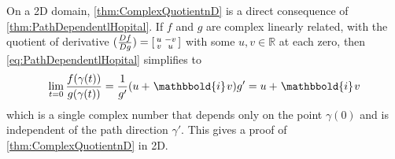 \documentclass{article}
\newcommand{\Albert}[1]{{\color[rgb]{0.2,0.4,0.8}\textbf{Albert: } #1}}
\theoremstyle{theorem}
\theoremstyle{definition}
\def\CC{\mathbb{C}}
\def\RR{\mathbb{R}}
\def\bx{\mathbf{x}}
\def\bzero{\mathbf{0}}
\newcommand{\ii}{\mkern1.5mu\mathbbold{i}\mkern1.5mu}
\begin{document}

On a 2D domain, \autoref{thm:ComplexQuotientnD} is a direct consequence of \autoref{thm:PathDependentlHopital}. 
If \(f\) and \(g\) are complex linearly related, 
with  the quotient of derivative
\(({Df\over Dg}) = \begin{bsmallmatrix}
    u&-v\\
    v & u
\end{bsmallmatrix}\) with some $u,v\in \RR$ at each zero, 
then \eqref{eq:PathDependentlHopital} simplifies to 
\begin{align*}
    \lim_{t=0}{f(\gamma(t))\over g(\gamma(t))} = {1\over g'}(u+\ii v)g' = u+\ii v
\end{align*}
which is a single complex number that depends only on the point \(\gamma(0)\) and is independent of the path direction \(\gamma'\). This gives a proof of \autoref{thm:ComplexQuotientnD} in 2D.
\end{document}

